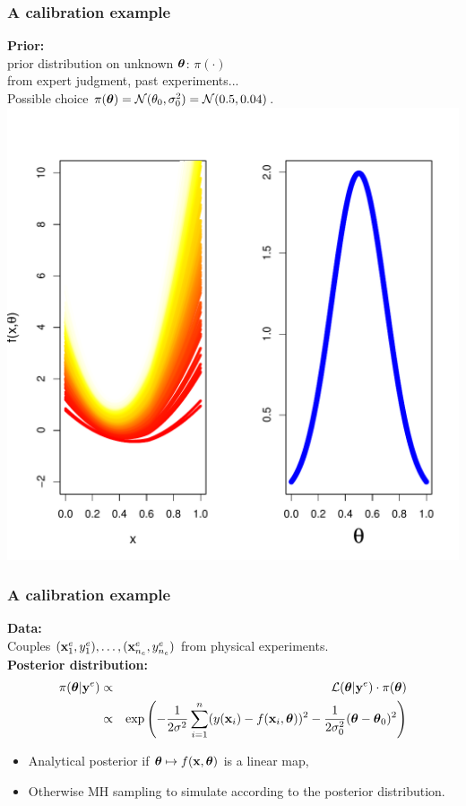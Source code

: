 \documentclass[nopagenumber,9pt]{beamer}
\begin{document}
 
  \begin{frame}
 \frametitle{A calibration example}

 \textbf{Prior:}\\
 prior distribution on unknown $\boldsymbol{\theta}$: $\pi(\cdot)$
 \\
 from expert judgment, past experiments...
 \\
 Possible choice $\pi(\boldsymbol{\theta})=\mathcal{N}(\theta_0,\sigma_0^2)=\mathcal{N}(0.5,0.04)$.
 \\
 
 \includegraphics[width=1\textwidth,height=.5\textwidth]{prior.pdf}
 


 \end{frame}

 
 
 
 \begin{frame}
  \frametitle{A calibration example}
 \bigskip
 \textbf{Data:} \\
 Couples $(\mathbf{x}^e_1,y^{e}_1),\ldots,(\mathbf{x}^e_{n_e},y^{e}_{n_e})$
 from physical experiments.
 \\
 
 \bigskip
 \textbf{Posterior distribution:}\\
 \begin{eqnarray*}
\pi(\boldsymbol{\theta}|\mathbf{y}^{e})&\propto& \mathcal{L}(\boldsymbol{\theta}|\mathbf{y}^{e}) \cdot \pi(\boldsymbol{\theta})\\
&\propto&\exp\left( 
-\frac{1}{2\sigma^2}\sum_{i=1}^n (y(\mathbf{x}_i)-f(\mathbf{x}_i,\boldsymbol{\theta}))^2-\frac{1}{2\sigma_0^2}(\boldsymbol{\theta}-\boldsymbol{\theta}_0)^2
\right)  
 \end{eqnarray*}

 \begin{itemize}
  \item Analytical posterior if $\boldsymbol{\theta}\mapsto f(\mathbf{x},\boldsymbol{\theta})$ is a linear map,
  \item Otherwise MH sampling to simulate according to the posterior distribution. \cite{robert1999monte}
 \end{itemize}


\end{frame}
\end{document}
